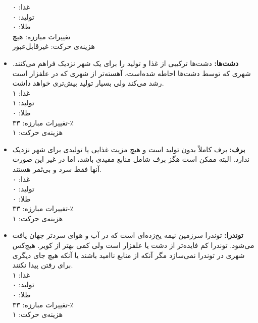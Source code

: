 \documentclass[]{article}
\begin{document}
\begin{itemize}
	غذا: ۰\\
	تولید: ۰\\
	طلا: ۰\\
	تغییرات مبارزه: هیچ\\
	هزینه‌ی حرکت: غیرقابل‌عبور
	\item \textbf{دشت‌ها:} دشت‌ها ترکیبی از غذا و تولید را برای یک شهر نزدیک فراهم می‌کنند. شهری که توسط دشت‌ها احاطه شده‌است، آهسته‌تر از شهری که در علفزار است رشد می‌کند ولی بسیار تولید بیش‌تری خواهد داشت.\\
	غذا: ۱\\
	تولید: ۱\\
	طلا: ۰\\
	تغییرات مبارزه: ۳۳-٪\\
	هزینه‌ی حرکت: ۱
	\item \textbf{برف:} برف کاملاً بدون تولید است و هیچ مزیت غذایی یا تولیدی برای شهر نزدیک ندارد. البته ممکن است هگز برف شامل منابع مفیدی باشد، اما در غیر این صورت آنها فقط سرد و بی‌ثمر هستند.\\
	غذا: ۰\\
	تولید: ۰\\
	طلا: ۰\\
	تغییرات مبارزه: ۳۳-٪\\
	هزینه‌ی حرکت: ۱
	\item \textbf{توندرا:} توندرا سرزمین نیمه یخ‌زده‌ای است که در آب و هوای سردتر جهان یافت می‌شود. توندرا کم فایده‌تر از دشت یا علفزار است ولی کمی بهتر از کویر. هیچ‌کس شهری در توندرا نمی‌سازد مگر آنکه از منابع ناامید باشند یا آنکه هیچ جای دیگری برای رفتن پیدا نکنند.\\
	غذا: ۱\\
	تولید: ۰\\
	طلا: ۰\\
	تغییرات مبارزه: ۳۳-٪\\
	هزینه‌ی حرکت: ۱
\end{itemize}
\end{document}
